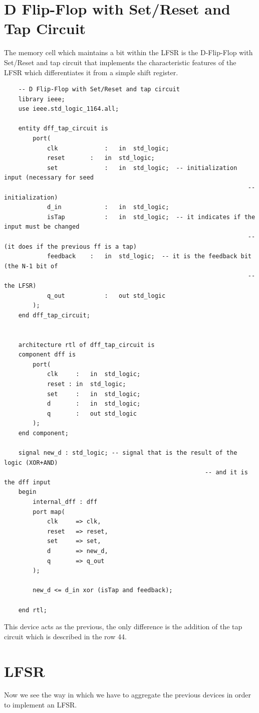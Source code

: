 \documentclass[a4paper]{report}
\begin{document}
\section{D Flip-Flop with Set/Reset and Tap Circuit}
The memory cell which maintains a bit within the LFSR is the D-Flip-Flop with Set/Reset and tap circuit that implements the characteristic features of the LFSR which differentiates it from a simple shift register.
\begin{lstlisting}
	-- D Flip-Flop with Set/Reset and tap circuit
	library ieee;
	use ieee.std_logic_1164.all;
	
	entity dff_tap_circuit is
		port(
			clk				:	in 	std_logic;
			reset 		:	in 	std_logic;
			set				:	in 	std_logic;  -- initialization input (necessary for seed
																	-- initialization)
			d_in			:	in 	std_logic;	
			isTap			:	in 	std_logic;	-- it indicates if the input must be changed
																	-- (it does if the previous ff is a tap)
			feedback	:	in 	std_logic;  -- it is the feedback bit (the N-1 bit of 
																	-- the LFSR)
			q_out			:	out std_logic
		);
	end dff_tap_circuit;
	
	
	architecture rtl of dff_tap_circuit is
	component dff is
		port(
			clk		:	in 	std_logic;
			reset :	in 	std_logic;
			set		:	in 	std_logic;
			d 		:	in 	std_logic;
			q 		:	out std_logic
		);
	end component;
	
	signal new_d : std_logic; -- signal that is the result of the logic (XOR+AND)
														-- and it is the dff input
	begin
		internal_dff : dff
		port map(
			clk 	=> clk,
			reset	=> reset,
			set 	=> set,
			d 		=> new_d,
			q 		=> q_out
		);
		
		new_d <= d_in xor (isTap and feedback);
	
	end rtl;
\end{lstlisting}
This device acts as the previous, the only difference is the addition of the tap circuit which is described in the row 44.

\section{LFSR}
Now we see the way in which we have to aggregate the previous devices in order to implement an LFSR.
\end{document}

